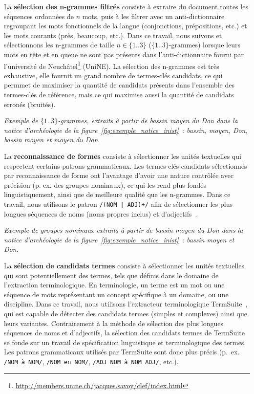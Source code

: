     La \textbf{sélection des n-grammes filtrés} consiste à extraire du document
    toutes les séquences ordonnées de $n$ mots, puis à les filtrer avec un
    anti-dictionnaire regroupant les mots fonctionnels de la langue
    (conjonctions, prépositions, etc.) et les mots courants (\og{}près\fg{},
    \og{}beaucoup\fg{}, etc.). Dans ce travail, nous suivons
     et sélectionnons les n-grammes de taille $n \in
    \{1..3\}$ ($\{1..3\}$-grammes) lorsque leurs mots en tête et en queue ne
    sont pas présents dans l'anti-dictionnaire fourni par l'université de
    Neuchâtel\footnote{\url{http://members.unine.ch/jacques.savoy/clef/index.html}}
    (UniNE). La sélection des n-grammes est très exhaustive, elle fournit un
    grand nombre de termes-clés candidats, ce qui permmet de maximiser la
    quantité de candidats présents dans l'ensemble des termes-clés de référence,
    mais ce qui maximise aussi la quantité de candidats erronés (bruités).
    
    \textit{Exemple de $\{1..3\}$-grammes, extraits à partir de \og{}bassin
    moyen du Don\fg{} dans la notice d'archéologie de la
    figure~\ref{fig:exemple_notice_inist}~: \og{}bassin\fg{}, \og{}moyen\fg{},
    \og{}Don\fg{}, \og{}bassin moyen\fg{} et \og{}moyen du Don\fg{}}.

    La \textbf{reconnaissance de formes} consiste à sélectionner les unités
    textuelles qui respectent certains patrons grammaticaux. Les termes-clés
    candidats sélectionnés par reconnaissance de forme ont l'avantage d'avoir
    une nature contrôlée avec précision (p. ex. des groupes nominaux), ce qui
    les rend plus fondés linguistiquement, ainsi que de meilleure qualité que
    les n-grammes. Dans ce travail, nous utilisons le patron
    \texttt{/(NOM | ADJ)+/} afin de sélectionner les plus longues séquences de
    noms (noms propres inclus) et d'adjectifs~\cite{hassan2010conundrums}.
    
    \textit{Exemple de groupes nominaux extraits à partir de \og{}bassin moyen
    du Don\fg{} dans la notice d'archéologie de la
    figure~\ref{fig:exemple_notice_inist}~: \og{}bassin moyen\fg{} et
    \og{}Don\fg{}.}

    La \textbf{sélection de candidats termes} consiste à sélectionner les unités
    textuelles qui sont potentiellement des termes, tels que définis dans le
    domaine de l'extraction terminologique. En terminologie, un terme est un mot
    ou une séquence de mots représentant un concept spécifique à un domaine, ou
    une discipline. Dans ce travail, nous utilisons l'extracteur terminologique
    TermSuite~\cite{rocheteau2011termsuite}, qui est capable de détecter des
    candidats termes (simples et complexes) ainsi que leurs variantes.
    Contrairement à la méthode de sélection des plus longues séquences de noms
    et d'adjectifs, la sélection des candidats termes de TermSuite se fonde sur
    un travail de spécification linguistique et terminologique des termes. Les
    patrons grammaticaux utilisés par TermSuite sont donc plus précis (p.~ex.
    \texttt{/NOM à NOM/}, \texttt{/NOM en NOM/}, \texttt{/ADJ NOM à NOM ADJ/},
    etc.).
    
